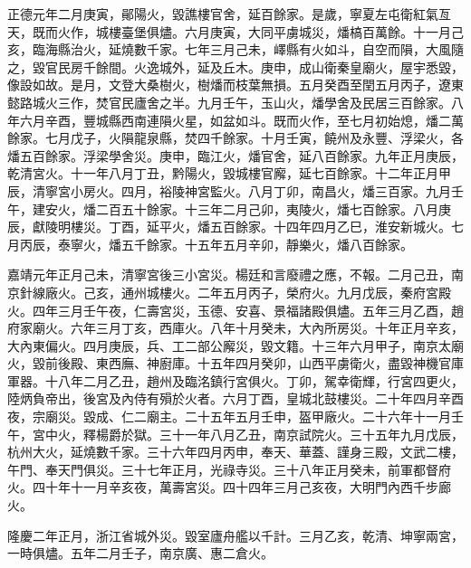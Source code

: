 \begin{pinyinscope}
正德元年二月庚寅，鄖陽火，毀譙樓官舍，延百餘家。是歲，寧夏左屯衛紅氣亙天，既而火作，城樓臺堡俱燼。六月庚寅，大同平虜城災，燔槁百萬餘。十一月己亥，臨海縣治火，延燒數千家。七年三月己未，嶧縣有火如斗，自空而隕，大風隨之，毀官民房千餘間。火逸城外，延及丘木。庚申，成山衛秦皇廟火，屋宇悉毀，像設如故。是月，文登大桑樹火，樹燔而枝葉無損。五月癸酉至閏五月丙子，遼東懿路城火三作，焚官民廬舍之半。九月壬午，玉山火，燔學舍及民居三百餘家。八年六月辛酉，豐城縣西南連隕火星，如盆如斗。既而火作，至七月初始熄，燔二萬餘家。七月戊子，火隕龍泉縣，焚四千餘家。十月壬寅，饒州及永豐、浮梁火，各燔五百餘家。浮梁學舍災。庚申，臨江火，燔官舍，延八百餘家。九年正月庚辰，乾清宮火。十一年八月丁丑，黔陽火，毀城樓官廨，延七百餘家。十二年正月甲辰，清寧宮小房火。四月，裕陵神宮監火。八月丁卯，南昌火，燔三百家。九月壬午，建安火，燔二百五十餘家。十三年二月己卯，夷陵火，燔七百餘家。八月庚辰，獻陵明樓災。丁酉，延平火，燔五百餘家。十四年四月乙巳，淮安新城火。七月丙辰，泰寧火，燔五千餘家。十五年五月辛卯，靜樂火，燔八百餘家。

嘉靖元年正月己未，清寧宮後三小宮災。楊廷和言廢禮之應，不報。二月己丑，南京針線廠火。己亥，通州城樓火。二年五月丙子，榮府火。九月戊辰，秦府宮殿火。四年三月壬午夜，仁壽宮災，玉德、安喜、景福諸殿俱燼。五年三月乙酉，趙府家廟火。六年三月丁亥，西庫火。八年十月癸未，大內所房災。十年正月辛亥，大內東偏火。四月庚辰，兵、工二部公廨災，毀文籍。十三年六月甲子，南京太廟火，毀前後殿、東西廡、神廚庫。十五年四月癸卯，山西平虜衛火，盡毀神機官庫軍器。十八年二月乙丑，趙州及臨洺鎮行宮俱火。丁卯，駕幸衛輝，行宮四更火，陸炳負帝出，後宮及內侍有殞於火者。六月丁酉，皇城北鼓樓災。二十年四月辛酉夜，宗廟災。毀成、仁二廟主。二十五年五月壬申，盔甲廠火。二十六年十一月壬午，宮中火，釋楊爵於獄。三十一年八月乙丑，南京試院火。三十五年九月戊辰，杭州大火，延燒數千家。三十六年四月丙申，奉天、華蓋、謹身三殿，文武二樓，午門、奉天門俱災。三十七年正月，光祿寺災。三十八年正月癸未，前軍都督府火。四十年十一月辛亥夜，萬壽宮災。四十四年三月己亥夜，大明門內西千步廊火。

隆慶二年正月，浙江省城外災。毀室廬舟艦以千計。三月乙亥，乾清、坤寧兩宮，一時俱燼。五年二月壬子，南京廣、惠二倉火。


\end{pinyinscope}
